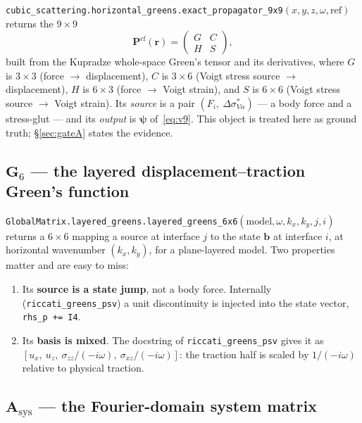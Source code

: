 \documentclass[11pt,a4paper]{article}
\newcommand{\bG}{\mathbf{G}}
\newcommand{\bP}{\mathbf{P}}
\newcommand{\Asys}{\mathbf{A}_{\text{sys}}}
\begin{document}
\texttt{cubic\_scattering.horizontal\_greens.exact\_propagator\_9x9}$(x,y,z,\omega,\text{ref})$
returns the $9\times9$
\begin{equation}\label{eq:Pcf}
  \bP^{\text{cf}}(\mathbf{r}) =
  \begin{pmatrix} G & C \\ H & S \end{pmatrix},
\end{equation}
built from the Kupradze whole-space Green's tensor and its derivatives, where
$G$ is $3\times3$ (force $\to$ displacement), $C$ is $3\times6$ (Voigt stress
source $\to$ displacement), $H$ is $6\times3$ (force $\to$ Voigt strain), and
$S$ is $6\times6$ (Voigt stress source $\to$ Voigt strain).  Its \emph{source}
is a pair $(F_i,\ \Delta\sigma^{*}_{V\alpha})$ --- a body force and a
stress-glut --- and its \emph{output} is $\boldsymbol{\psi}$ of~\eqref{eq:v9}.
This object is treated here as ground truth; \S\ref{sec:gateA} states the
evidence.

\subsection{$\bG_6$ --- the layered displacement--traction Green's function}

\texttt{GlobalMatrix.layered\_greens.layered\_greens\_6x6}$(\text{model},\omega,k_x,k_y,j,i)$
returns a $6\times6$ mapping a source at interface $j$ to the state
$\mathbf{b}$ at interface $i$, at horizontal wavenumber $(k_x,k_y)$, for a
plane-layered model.  Two properties matter and are easy to miss:

\begin{enumerate}
\item Its \textbf{source is a state jump}, not a body force.  Internally
      (\texttt{riccati\_greens\_psv}) a unit discontinuity is injected into the
      state vector, \texttt{rhs\_p += I4}.
\item Its \textbf{basis is mixed}.  The docstring of
      \texttt{riccati\_greens\_psv} gives it as
      $[u_x,\ u_z,\ \sigma_{zz}/(-i\omega),\ \sigma_{xz}/(-i\omega)]$: the
      traction half is scaled by $1/(-i\omega)$ relative to physical traction.
\end{enumerate}

\subsection{$\Asys$ --- the Fourier-domain system matrix}
\end{document}
